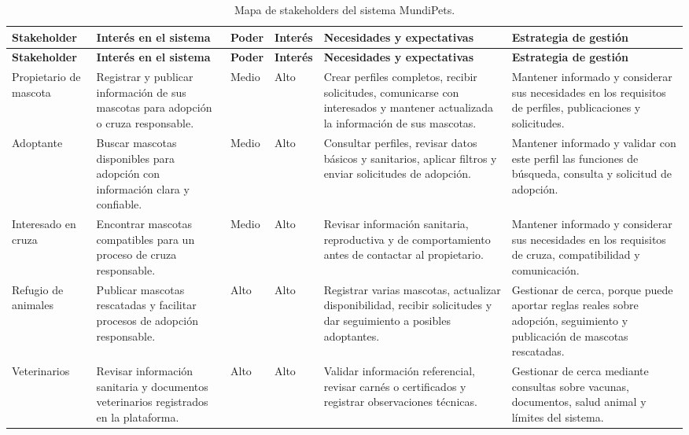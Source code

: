 \documentclass[journal,onecolumn]{IEEEtran}
\begin{document}
	\begin{longtable}{|p{1.8cm}|p{2.4cm}|p{1cm}|p{1cm}|p{3.7cm}|p{3.6cm}|}
		\caption{Mapa de stakeholders del sistema MundiPets.} \label{tab:matriz_stakeholders} \\
		\hline
		\textbf{Stakeholder} & \textbf{Interés en el sistema} & \textbf{Poder} & \textbf{Interés} & \textbf{Necesidades y expectativas} & \textbf{Estrategia de gestión} \\
		\hline
		\endfirsthead
		\hline
		\textbf{Stakeholder} & \textbf{Interés en el sistema} & \textbf{Poder} & \textbf{Interés} & \textbf{Necesidades y expectativas} & \textbf{Estrategia de gestión} \\
		\hline
		\endhead
		\hline
		\endfoot
		\hline
		\endlastfoot
		
		Propietario de mascota & Registrar y publicar información de sus mascotas para adopción o cruza responsable. & Medio & Alto & Crear perfiles completos, recibir solicitudes, comunicarse con interesados y mantener actualizada la información de sus mascotas. & Mantener informado y considerar sus necesidades en los requisitos de perfiles, publicaciones y solicitudes. \\ \hline
		
		Adoptante & Buscar mascotas disponibles para adopción con información clara y confiable. & Medio & Alto & Consultar perfiles, revisar datos básicos y sanitarios, aplicar filtros y enviar solicitudes de adopción. & Mantener informado y validar con este perfil las funciones de búsqueda, consulta y solicitud de adopción. \\ \hline
		
		Interesado en cruza & Encontrar mascotas compatibles para un proceso de cruza responsable. & Medio & Alto & Revisar información sanitaria, reproductiva y de comportamiento antes de contactar al propietario. & Mantener informado y considerar sus necesidades en los requisitos de cruza, compatibilidad y comunicación. \\ \hline
		
		Refugio de animales & Publicar mascotas rescatadas y facilitar procesos de adopción responsable. & Alto & Alto & Registrar varias mascotas, actualizar disponibilidad, recibir solicitudes y dar seguimiento a posibles adoptantes. & Gestionar de cerca, porque puede aportar reglas reales sobre adopción, seguimiento y publicación de mascotas rescatadas. \\ \hline
		
		Veterinarios & Revisar información sanitaria y documentos veterinarios registrados en la plataforma. & Alto & Alto & Validar información referencial, revisar carnés o certificados y registrar observaciones técnicas. & Gestionar de cerca mediante consultas sobre vacunas, documentos, salud animal y límites del sistema. \\ \hline
		

\end{longtable}
\end{document}
